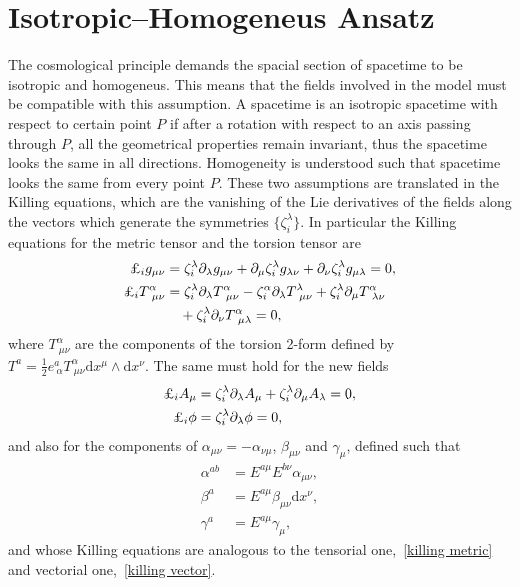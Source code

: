 \documentclass[aps,prd,12pt,superscriptaddress,showpacs,showkeys,longbibliography,reprint,nofootinbib]{revtex4-1}
\begin{document}
\section{Isotropic--Homogeneus Ansatz\label{homotropic}}

The cosmological principle demands the spacial section of spacetime to be isotropic and homogeneus. This means that the fields involved in the model must be compatible with this assumption. A spacetime is an isotropic spacetime with respect to certain point $P$ if after a rotation with respect to an axis passing through $P$, all the geometrical properties remain invariant, thus the spacetime looks the same in all directions. Homogeneity is understood such that spacetime looks the same from every point $P$. These two assumptions are translated in the Killing equations, which are the vanishing of the Lie derivatives of the fields along the vectors which generate the symmetries $\{\zeta^\lambda_{i}\}$. In particular the Killing equations for the metric tensor and the torsion tensor are
\begin{align}
  \label{killing metric}
  \text{\textsterling}_i g_{\mu\nu}&=\zeta^\lambda_i\partial_\lambda g_{\mu\nu}+\partial_\mu\zeta^\lambda_i g_{\lambda\nu}+\partial_\nu\zeta^\lambda_i g_{\mu\lambda}=0,\\
  \text{\textsterling}_i T^\alpha_{\ \mu\nu}&=\zeta^\lambda_i\partial_\lambda T^\alpha_{\ \mu\nu}-\zeta^\alpha_i\partial_\lambda T^\lambda_{\ \mu\nu}
  +\zeta^\lambda_i\partial_\mu T^\alpha_{\ \lambda\nu}\notag\\
  &\quad +\zeta^\lambda_i\partial_\nu T^\alpha_{\ \mu\lambda}=0,
\end{align}
where $T^\alpha_{\ \mu\nu}$ are the components of the torsion 2-form defined by $T^a=\frac{1}{2}e^a_{\ \alpha}T^\alpha_{\ \mu\nu}\mbox{d}x^\mu\wedge\mbox{d}x^\nu$. The same must hold for the new fields
\begin{align}
  \label{killing vector}
  \text{\textsterling}_i A_\mu&=\zeta^\lambda_i\partial_\lambda A_\mu+\zeta^\lambda_i\partial_\mu A_\lambda=0,\\
  \text{\textsterling}_i \phi &=\zeta^\lambda_i\partial_\lambda\phi=0,
\end{align}
and also for the components of $\alpha_{\mu\nu}=-\alpha_{\nu\mu}$, $\beta_{\mu\nu}$ and $\gamma_\mu$, defined such that
\begin{align*}
  \alpha^{ab}&=E^{a\mu}E^{b\nu}\alpha_{\mu\nu},\\
  \beta^a&=E^{a\mu}\beta_{\mu\nu}\mbox{d}x^\nu,\\
  \gamma^a&=E^{a\mu}\gamma_\mu,
\end{align*} 
and whose Killing equations are analogous to the tensorial one,~\eqref{killing metric} and vectorial one,~\eqref{killing vector}.
\end{document}
